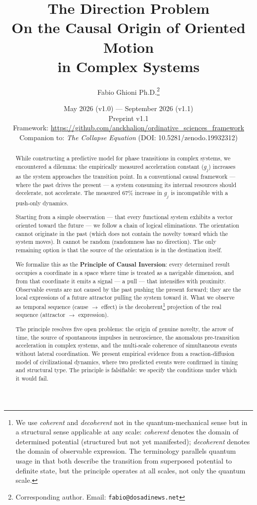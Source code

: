 \documentclass[12pt,a4paper]{article}
\title{\textbf{The Direction Problem}\\[0.5em]\large On the Causal Origin of Oriented Motion\\in Complex Systems}
\author[1]{Fabio Ghioni Ph.D.\thanks{Corresponding author. Email: \texttt{fabio@dosadinews.net}}}
\affil[1]{Ordinative Sciences Foundation Research Labs\\\small\url{https://ordinativescience.foundation}}
\date{May 2026 (v1.0) --- September 2026 (v1.1)\\[0.5em]\small Preprint v1.1\\[0.3em]\small Framework: \url{https://github.com/anckhalion/ordinative_sciences_framework}\\[0.3em]\small Companion to: \emph{The Collapse Equation} (DOI: 10.5281/zenodo.19932312)}
\newcommand{\gj}{g_j}
\begin{document}
\maketitle

\begin{abstract}
While constructing a predictive model for phase transitions in complex systems, we encountered a dilemma: the empirically measured acceleration constant ($\gj$) increases as the system approaches the transition point. In a conventional causal framework --- where the past drives the present --- a system consuming its internal resources should decelerate, not accelerate. The measured 67\% increase in $\gj$ is incompatible with a push-only dynamics.

Starting from a simple observation --- that every functional system exhibits a vector oriented toward the future --- we follow a chain of logical eliminations. The orientation cannot originate in the past (which does not contain the novelty toward which the system moves). It cannot be random (randomness has no direction). The only remaining option is that the source of the orientation is in the destination itself.

We formalize this as the \textbf{Principle of Causal Inversion}: every determined result occupies a coordinate in a space where time is treated as a navigable dimension, and from that coordinate it emits a signal --- a pull --- that intensifies with proximity. Observable events are not caused by the past pushing the present forward; they are the local expressions of a future attractor pulling the system toward it. What we observe as temporal sequence (cause $\to$ effect) is the decoherent\footnote{We use \emph{coherent} and \emph{decoherent} not in the quantum-mechanical sense but in a structural sense applicable at any scale: \emph{coherent} denotes the domain of determined potential (structured but not yet manifested); \emph{decoherent} denotes the domain of observable expression. The terminology parallels quantum usage in that both describe the transition from superposed potential to definite state, but the principle operates at all scales, not only the quantum scale.} projection of the real sequence (attractor $\to$ expression).

The principle resolves five open problems: the origin of genuine novelty, the arrow of time, the source of spontaneous impulses in neuroscience, the anomalous pre-transition acceleration in complex systems, and the multi-scale coherence of simultaneous events without lateral coordination. We present empirical evidence from a reaction-diffusion model of civilizational dynamics, where two predicted events were confirmed in timing and structural type. The principle is falsifiable: we specify the conditions under which it would fail.


\end{abstract}
\end{document}
